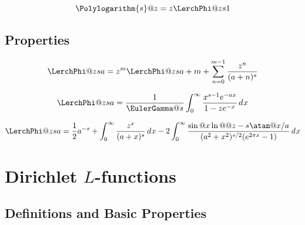 \documentclass{article}
\begin{document}
\begin{equation}\label{eq:ZE.LER.LER2B}
  \Polylogarithm{s}@{z} = z \LerchPhi@{z}{s}{1}
\end{equation}

\subsection{Properties}\label{sec:ZE.LER.Prop}%
 

\begin{equation}\label{eq:ZE.LER.LER3}%
  \LerchPhi@{z}{s}{a}
  = z^m \LerchPhi@{z}{s}{a+m} + \sum_{n=0}^{m-1} \frac{z^n}{(a+n)^s}
\end{equation}

\begin{equation}\label{eq:ZE.LER.LER4}%
  \LerchPhi@{z}{s}{a}
  = \frac{1}{\EulerGamma@{s}}
    \int_0^\infty \frac{x^{s-1} \expe^{-ax}}{1-z\expe^{-x}} \diff{x}
\end{equation}

\begin{equation}\label{eq:ZE.LER.LER5}%
  \LerchPhi@{z}{s}{a}
  = \frac{1}{2} a^{-s}
  + \int_0^\infty \frac{z^x}{(a+x)^s} \diff{x}
  - 2 \int_0^\infty
          \frac{\sin@{x \ln@@{z} - s \atan@{x/a}}}
               {(a^2 + x^2)^{s/2} (\expe^{2 \cpi x} - 1)}
      \diff{x}
\end{equation}

\section{Dirichlet $L$-functions}\label{sec:ZE.DIR}%

\subsection{Definitions and Basic Properties}\label{sec:ZE.DIR.Def}%

 
\end{document}
